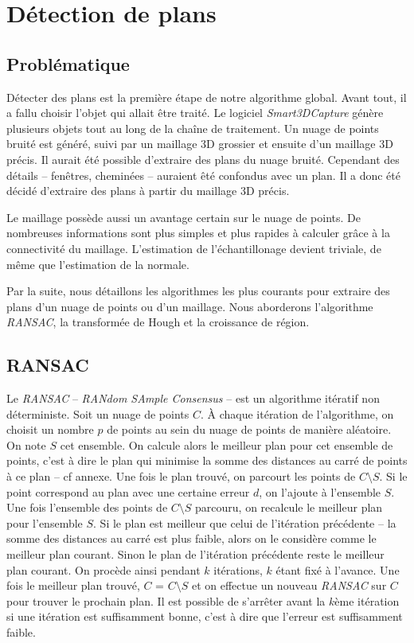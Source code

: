 ﻿\documentclass[12pt, twoside]{article}
\let\oldsection\section
\def\section{\cleardoublepage\oldsection}
\begin{document}
\section{Détection de plans}
\subsection{Problématique}
Détecter des plans est la première étape de notre algorithme global. Avant tout, il a fallu choisir l'objet qui allait être traité. Le logiciel \textit{Smart3DCapture} génère plusieurs objets tout au long de la chaîne de traitement. Un nuage de points bruité est généré, suivi par un maillage 3D grossier et ensuite d'un maillage 3D précis. Il aurait été possible d'extraire des plans du nuage bruité. Cependant des détails -- fenêtres, cheminées -- auraient êté confondus avec un plan. Il a donc été décidé d'extraire des plans à partir du maillage 3D précis.

Le maillage possède aussi un avantage certain sur le nuage de points. De nombreuses informations sont plus simples et plus rapides à calculer grâce à la connectivité du maillage. L'estimation de l'échantillonage devient triviale, de même que l'estimation de la normale.

Par la suite, nous détaillons les algorithmes les plus courants pour extraire des plans d'un nuage de points ou d'un maillage. Nous aborderons l'algorithme \textit{RANSAC}, la transformée de Hough et la croissance de région.

\subsection{RANSAC}
Le \textit{RANSAC} -- \textit{RANdom SAmple Consensus} -- est un algorithme itératif non déterministe. Soit un nuage de points $C$. À chaque itération de l’algorithme, on choisit un nombre $p$ de points au sein du nuage de points de manière aléatoire. On note $S$ cet ensemble. On calcule alors le meilleur plan pour cet ensemble de points, c’est à dire le plan qui minimise la somme des distances au carré de points à ce plan -- cf annexe. Une fois le plan trouvé, on parcourt les points de $C\setminus S$. Si le point correspond au plan avec une certaine erreur $d$, on l’ajoute à l’ensemble $S$. Une fois l’ensemble des points de $C\setminus S$ parcouru, on recalcule le meilleur plan pour l’ensemble $S$. Si le plan est meilleur que celui de l’itération précédente -- la somme des distances au carré est plus faible, alors on le considère comme le meilleur plan courant. Sinon le plan de l’itération précédente reste le meilleur plan courant. On procède ainsi pendant $k$ itérations, $k$ étant fixé à l’avance. Une fois le meilleur plan trouvé, $C$ = $C\setminus S$ et on effectue un nouveau \textit{RANSAC} sur $C$ pour trouver le prochain plan. Il est possible de s’arrêter avant la $k$ème itération si une itération est suffisamment bonne, c’est à dire que l’erreur est suffisamment faible.
\end{document}
